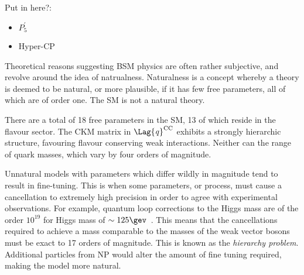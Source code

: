Put in here?:
\begin{itemize}
  \item $P_5^\prime$
  \item Hyper-CP
\end{itemize}


Theoretical reasons suggesting BSM physics
are often rather subjective, and revolve around the idea of natrualness.
Naturalness is a concept whereby a theory is deemed to be natural, or more plausible, if it has few
free parameters, all of which are of order one.
The SM is not a natural theory.

There are a total of 18 free parameters in the SM, 13 of which reside in the flavour sector.
The CKM matrix in $\Lag{\it q}^\mathrm{CC}$ exhibits a strongly hierarchic structure, favouring
flavour conserving weak interactions.
Neither can the range of quark masses, which vary by four orders of magnitude.

Unnatural models with parameters which differ wildly in magnitude tend to result in fine-tuning.
This is when some parameters, or process, must cause a cancellation to extremely high precision in
order to agree with experimental observations.
For example, quantum loop corrections to the Higgs mass are of the order $10^{19}$ for Higgs mass
of $\sim125\gev$~\cite{Chatrchyan:2012ufa,Aad:2012tfa}.
This means that the cancellations required to achieve a mass comparable to the masses of the weak
vector bosons must be exact to 17 orders of magnitude.
This is known as the \emph{hierarchy problem}.
Additional particles from NP would alter the amount of fine tuning required, making the model more
natural.

